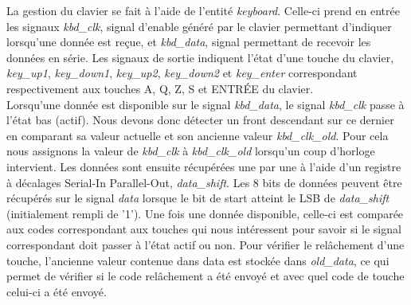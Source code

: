 La gestion du clavier se fait à l'aide de l'entité \emph{keyboard}. Celle-ci prend en entrée les signaux \emph{kbd\_clk}, signal d'enable généré par le clavier permettant d'indiquer lorsqu'une donnée est reçue, et \emph{kbd\_data}, signal permettant de recevoir les données en série. Les signaux de sortie indiquent l'état d'une touche du clavier, \emph{key\_up1}, \emph{key\_down1}, \emph{key\_up2}, \emph{key\_down2} et \emph{key\_enter} correspondant respectivement aux touches A, Q, Z, S et ENTRÉE du clavier.\\

Lorsqu'une donnée est disponible sur le signal \emph{kbd\_data}, le signal \emph{kbd\_clk} passe à l'état bas (actif). Nous devons donc détecter un front descendant sur ce dernier en comparant sa valeur actuelle et son ancienne valeur \emph{kbd\_clk\_old}. Pour cela nous assignons la valeur de \emph{kbd\_clk} à \emph{kbd\_clk\_old} lorsqu'un coup d'horloge intervient. Les données sont ensuite récupérées une par une à l'aide d'un registre à décalages Serial-In Parallel-Out, \emph{data\_shift}. Les 8 bits de données peuvent être récupérés sur le signal \emph{data} lorsque le bit de start atteint le LSB de \emph{data\_shift} (initialement rempli de '1'). Une fois une donnée disponible, celle-ci est comparée aux codes correspondant aux touches qui nous intéressent pour savoir si le signal correspondant doit passer à l'état actif ou non. Pour vérifier le relâchement d'une touche, l'ancienne valeur contenue dans data est stockée dans \emph{old\_data}, ce qui permet de vérifier si le code relâchement a été envoyé et avec quel code de touche celui-ci a été envoyé.

\newpage

